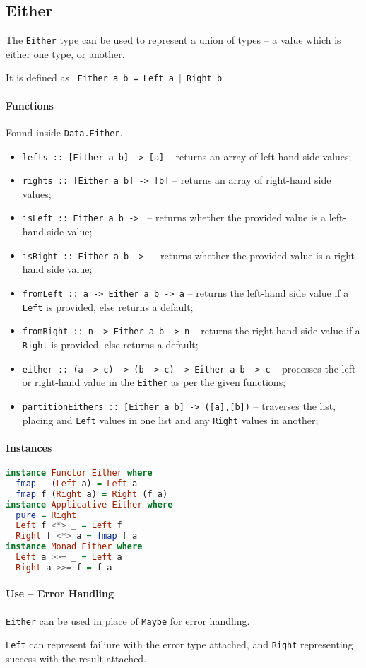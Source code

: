 \subsection{Either}
The \texttt{Either} type can be used to represent a union of types -- a value which is either one type, or another.

It is defined as \texttt{ Either a b = Left a $\mid$ Right b}

\paragraph{Functions}
Found inside \texttt{Data.Either}.
\begin{itemize}
  \item \texttt{lefts :: [Either a b] -> [a]} -- returns an array of left-hand side values;
  \item \texttt{rights :: [Either a b] -> [b]} -- returns an array of right-hand side values;
  \item \texttt{isLeft :: Either a b -> } -- returns whether the provided value is a left-hand side value;
  \item \texttt{isRight :: Either a b -> } -- returns whether the provided value is a right-hand side value;
  \item \texttt{fromLeft :: a -> Either a b -> a} -- returns the left-hand side value if a \texttt{Left} is provided, else returns a default;
  \item \texttt{fromRight :: n -> Either a b -> n} -- returns the right-hand side value if a \texttt{Right} is provided, else returns a default;
  \item \texttt{either :: (a -> c) -> (b -> c) -> Either a b -> c} -- processes the left- or right-hand value in the \texttt{Either} as per the given functions;
  \item \texttt{partitionEithers :: [Either a b] -> ([a],[b])} -- traverses the list, placing and \texttt{Left} values in one list and any \texttt{Right} values in another;
\end{itemize}

\paragraph{Instances}
\begin{lstlisting}[language=haskell]
instance Functor Either where
  fmap _ (Left a) = Left a
  fmap f (Right a) = Right (f a)
instance Applicative Either where
  pure = Right
  Left f <*> _ = Left f
  Right f <*> a = fmap f a
instance Monad Either where
  Left a >>= _ = Left a
  Right a >>= f = f a
\end{lstlisting}

\paragraph{Use -- Error Handling}
\texttt{Either} can be used in place of \texttt{Maybe} for error handling.

\texttt{Left} can represent failiure with the error type attached, and \texttt{Right} representing success with the result attached.